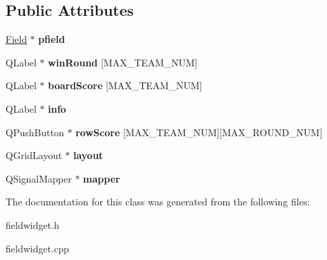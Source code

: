 \subsection*{Public Attributes}
\begin{DoxyCompactItemize}
\item 
\mbox{\label{class_field_widget_a2d8770e38b186be22c9dc18404057506}} 
\hyperlink{class_field}{Field} $\ast$ {\bfseries pfield}
\item 
\mbox{\label{class_field_widget_a437d8ee607d2b31e2beb3a32644758f9}} 
Q\+Label $\ast$ {\bfseries win\+Round} \mbox{[}M\+A\+X\+\_\+\+T\+E\+A\+M\+\_\+\+N\+UM\mbox{]}
\item 
\mbox{\label{class_field_widget_a9b0fc5a31ee310140ce2b2cf15624fcf}} 
Q\+Label $\ast$ {\bfseries board\+Score} \mbox{[}M\+A\+X\+\_\+\+T\+E\+A\+M\+\_\+\+N\+UM\mbox{]}
\item 
\mbox{\label{class_field_widget_a4bc96aea14c6dfbcdeeab55a63e0112c}} 
Q\+Label $\ast$ {\bfseries info}
\item 
\mbox{\label{class_field_widget_a414ae70b4bacd5444bea3fe2964b62c4}} 
Q\+Push\+Button $\ast$ {\bfseries row\+Score} \mbox{[}M\+A\+X\+\_\+\+T\+E\+A\+M\+\_\+\+N\+UM\mbox{]}\mbox{[}M\+A\+X\+\_\+\+R\+O\+U\+N\+D\+\_\+\+N\+UM\mbox{]}
\item 
\mbox{\label{class_field_widget_ac86e3e86c3a1b99a5daa691f6595381b}} 
Q\+Grid\+Layout $\ast$ {\bfseries layout}
\item 
\mbox{\label{class_field_widget_a96d6d8f9c842ae222bb5d0bd09e1fa80}} 
Q\+Signal\+Mapper $\ast$ {\bfseries mapper}
\end{DoxyCompactItemize}


The documentation for this class was generated from the following files\+:\begin{DoxyCompactItemize}
\item 
fieldwidget.\+h\item 
fieldwidget.\+cpp\end{DoxyCompactItemize}
